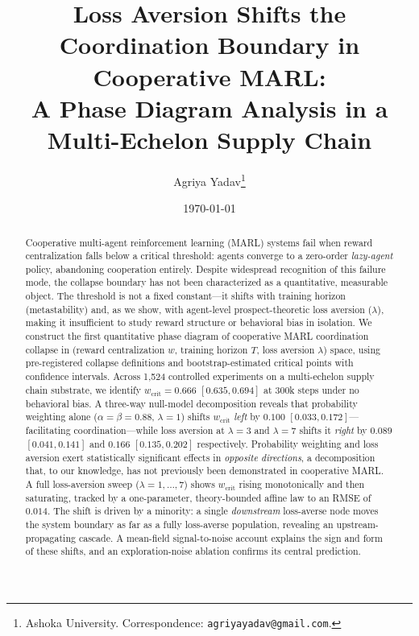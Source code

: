 \documentclass[11pt]{article}
\title{\textbf{Loss Aversion Shifts the Coordination Boundary in Cooperative MARL:\\
A Phase Diagram Analysis in a Multi-Echelon Supply Chain}}
\author{
Agriya Yadav\thanks{Ashoka University. Correspondence: \texttt{agriyayadav@gmail.com}.} \\
}
\date{\today}
\newcommand{\wcrit}{w_{\mathrm{crit}}}
\begin{document}
\maketitle

\begin{abstract}
Cooperative multi-agent reinforcement learning (MARL) systems fail when
reward centralization falls below a critical threshold: agents converge to
a zero-order \emph{lazy-agent} policy, abandoning cooperation entirely.
Despite widespread recognition of this failure mode, the collapse boundary
has not been characterized as a quantitative, measurable object.
The threshold is not a fixed constant---it shifts with training horizon
(metastability) and, as we show, with agent-level prospect-theoretic loss
aversion ($\lambda$), making it insufficient to study reward structure or
behavioral bias in isolation.
We construct the first quantitative phase diagram of cooperative MARL
coordination collapse in (reward centralization $w$, training horizon $T$,
loss aversion $\lambda$) space, using pre-registered collapse definitions
and bootstrap-estimated critical points with confidence intervals.
Across 1,524 controlled experiments on a multi-echelon supply chain
substrate, we identify $\wcrit = 0.666$ $[0.635, 0.694]$ at 300k steps
under no behavioral bias.
A three-way null-model decomposition reveals that probability weighting
alone ($\alpha{=}\beta{=}0.88$, $\lambda{=}1$) shifts $\wcrit$ \emph{left}
by $0.100$ $[0.033, 0.172]$---facilitating coordination---while loss
aversion at $\lambda{=}3$ and $\lambda{=}7$ shifts it \emph{right} by
$0.089$ $[0.041, 0.141]$ and $0.166$ $[0.135, 0.202]$ respectively.
Probability weighting and loss aversion exert statistically significant
effects in \emph{opposite directions}, a decomposition that, to our
knowledge, has not previously been demonstrated in cooperative MARL.
A full loss-aversion sweep ($\lambda = 1,\ldots,7$) shows $\wcrit$ rising
monotonically and then saturating, tracked by a one-parameter,
theory-bounded affine law to an RMSE of $0.014$.
The shift is driven by a minority: a single \emph{downstream} loss-averse
node moves the system boundary as far as a fully loss-averse population,
revealing an upstream-propagating cascade.
A mean-field signal-to-noise account explains the sign and form of these
shifts, and an exploration-noise ablation confirms its central prediction.
\end{abstract}
\end{document}
